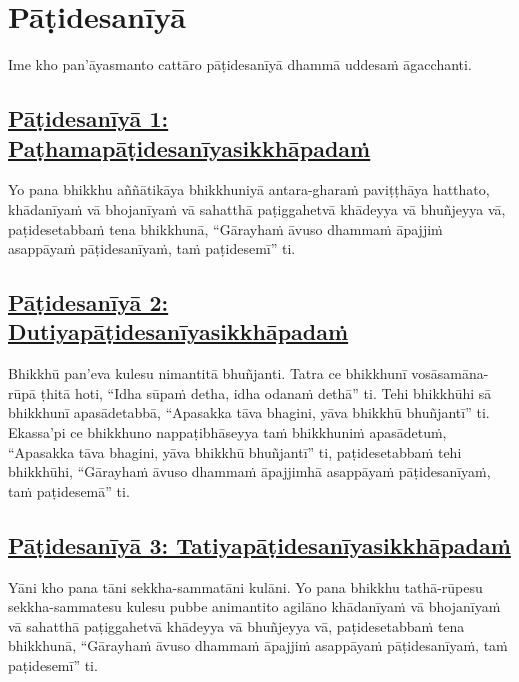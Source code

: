\section{Pāṭidesanīyā}
\label{pd}

\begin{intro}
  Ime kho pan'āyasmanto cattāro pāṭidesanīyā dhammā uddesaṁ āgacchanti.
\end{intro}

\setsubsecheadstyle{\subsubsectionFmt}
\subsection*{\hyperref[ack1]{Pāṭidesanīyā 1: Paṭhamapāṭidesanīyasikkhāpadaṁ}}
\label{pd1}

Yo pana bhikkhu aññātikāya bhikkhuniyā antara-gharaṁ paviṭṭhāya hatthato, khādanīyaṁ vā bhojanīyaṁ vā sahatthā paṭiggahetvā khādeyya vā bhuñjeyya vā, paṭidesetabbaṁ tena bhikkhunā, “Gārayhaṁ āvuso dhammaṁ āpajjiṁ asappāyaṁ pāṭidesanīyaṁ, taṁ paṭidesemī” ti.

\subsection*{\hyperref[ack2]{Pāṭidesanīyā 2: Dutiyapāṭidesanīyasikkhāpadaṁ}}
\label{pd2}

Bhikkhū pan'eva kulesu nimantitā bhuñjanti. Tatra ce bhikkhunī vosāsamāna-rūpā ṭhitā hoti, “Idha sūpaṁ detha, idha odanaṁ dethā” ti. Tehi bhikkhūhi sā bhikkhunī apasādetabbā, “Apasakka tāva bhagini, yāva bhikkhū bhuñjantī” ti. Ekassa'pi ce bhikkhuno nappaṭibhāseyya taṁ bhikkhuniṁ apasādetuṁ, “Apasakka tāva bhagini, yāva bhikkhū bhuñjantī” ti, paṭidesetabbaṁ tehi bhikkhūhi, “Gārayhaṁ āvuso dhammaṁ āpajjimhā asappāyaṁ pāṭidesanīyaṁ, taṁ paṭidesemā” ti.

\subsection*{\hyperref[ack3]{Pāṭidesanīyā 3: Tatiyapāṭidesanīyasikkhāpadaṁ}}
\label{pd3}

Yāni kho pana tāni sekkha-sammatāni kulāni. Yo pana bhikkhu tathā-rūpesu sekkha-sammatesu kulesu pubbe animantito agilāno khādanīyaṁ vā bhojanīyaṁ vā sahatthā paṭiggahetvā khādeyya vā bhuñjeyya vā, paṭidesetabbaṁ tena bhikkhunā, “Gārayhaṁ āvuso dhammaṁ āpajjiṁ asappāyaṁ pāṭidesanīyaṁ, taṁ paṭidesemī” ti.


